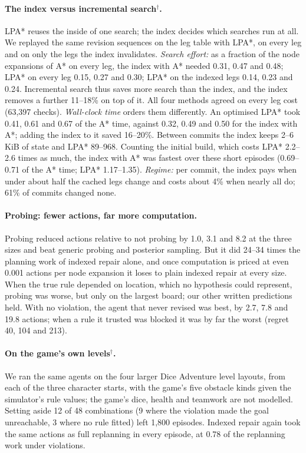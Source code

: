 \documentclass[letterpaper]{article}
\begin{document}
\paragraph{The index versus incremental search$^\dagger$.} LPA* \citep{koenig2004} reuses the inside of one search; the index decides which searches run at all. We replayed the same revision sequences on the leg table with LPA*, on every leg and on only the legs the index invalidates. \emph{Search effort:} as a fraction of the node expansions of A* on every leg, the index with A* needed 0.31, 0.47 and 0.48; LPA* on every leg 0.15, 0.27 and 0.30; LPA* on the indexed legs 0.14, 0.23 and 0.24. Incremental search thus saves more search than the index, and the index removes a further 11--18\% on top of it. All four methods agreed on every leg cost (63,397 checks). \emph{Wall-clock time} orders them differently. An optimised LPA* took 0.41, 0.61 and 0.67 of the A* time, against 0.32, 0.49 and 0.50 for the index with A*; adding the index to it saved 16--20\%. Between commits the index keeps 2--6\,KiB of state and LPA* 89--968. Counting the initial build, which costs LPA* 2.2--2.6 times as much, the index with A* was fastest over these short episodes (0.69--0.71 of the A* time; LPA* 1.17--1.35). \emph{Regime:} per commit, the index pays when under about half the cached legs change and costs about 4\% when nearly all do; 61\% of commits changed none.

\paragraph{Probing: fewer actions, far more computation.} Probing reduced actions relative to not probing by 1.0, 3.1 and 8.2 at the three sizes and beat generic probing and posterior sampling. But it did 24--34 times the planning work of indexed repair alone, and once computation is priced at even 0.001 actions per node expansion it loses to plain indexed repair at every size. When the true rule depended on location, which no hypothesis could represent, probing was worse, but only on the largest board; our other written predictions held. With no violation, the agent that never revised was best, by 2.7, 7.8 and 19.8 actions; when a rule it trusted was blocked it was by far the worst (regret 40, 104 and 213).

\paragraph{On the game's own levels$^\dagger$.} We ran the same agents on the four larger Dice Adventure level layouts, from each of the three character starts, with the game's five obstacle kinds given the simulator's rule values; the game's dice, health and teamwork are not modelled. Setting aside 12 of 48 combinations (9 where the violation made the goal unreachable, 3 where no rule fitted) left 1,800 episodes. Indexed repair again took the same actions as full replanning in every episode, at 0.78 of the replanning work under violations.
\end{document}
